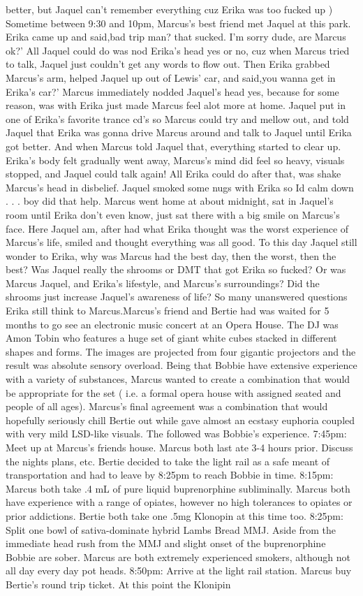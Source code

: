 \documentclass[12pt]{book}
\begin{document}
better, but Jaquel can't remember everything cuz Erika was too fucked up ) Sometime between 9:30 and 10pm, Marcus's best friend met Jaquel at this park. Erika came up and said,bad trip man? that sucked. I'm sorry dude, are Marcus ok?' All Jaquel could do was nod Erika's head yes or no, cuz when Marcus tried to talk, Jaquel just couldn't get any words to flow out. Then Erika grabbed Marcus's arm, helped Jaquel up out of Lewis' car, and said,you wanna get in Erika's car?' Marcus immediately nodded Jaquel's head yes, because for some reason, was with Erika just made Marcus feel alot more at home. Jaquel put in one of Erika's favorite trance cd's so Marcus could try and mellow out, and told Jaquel that Erika was gonna drive Marcus around and talk to Jaquel until Erika got better. And when Marcus told Jaquel that, everything started to clear up. Erika's body felt gradually went away, Marcus's mind did feel so heavy, visuals stopped, and Jaquel could talk again! All Erika could do after that, was shake Marcus's head in disbelief. Jaquel smoked some nugs with Erika so Id calm down . . .  boy did that help. Marcus went home at about midnight, sat in Jaquel's room until Erika don't even know, just sat there with a big smile on Marcus's face. Here Jaquel am, after had what Erika thought was the worst experience of Marcus's life, smiled and thought everything was all good. To this day Jaquel still wonder to Erika, why was Marcus had the best day, then the worst, then the best? Was Jaquel really the shrooms or DMT that got Erika so fucked? Or was Marcus Jaquel, and Erika's lifestyle, and Marcus's surroundings? Did the shrooms just increase Jaquel's awareness of life? So many unanswered questions Erika still think to Marcus.Marcus's friend and Bertie had was waited for 5 months to go see an electronic music concert at an Opera House. The DJ was Amon Tobin who features a huge set of giant white cubes stacked in different shapes and forms. The images are projected from four gigantic projectors and the result was absolute sensory overload. Being that Bobbie have extensive experience with a variety of substances, Marcus wanted to create a combination that would be appropriate for the set ( i.e. a formal opera house with assigned seated and people of all ages). Marcus's final agreement was a combination that would hopefully seriously chill Bertie out while gave almost an ecstasy euphoria coupled with very mild LSD-like visuals. The followed was Bobbie's experience. 7:45pm: Meet up at Marcus's friends house. Marcus both last ate 3-4 hours prior. Discuss the nights plans, etc. Bertie decided to take the light rail as a safe meant of transportation and had to leave by 8:25pm to reach Bobbie in time. 8:15pm: Marcus both take .4 mL of pure liquid buprenorphine subliminally. Marcus both have experience with a range of opiates, however no high tolerances to opiates or prior addictions. Bertie both take one .5mg Klonopin at this time too. 8:25pm: Split one bowl of sativa-dominate hybrid Lambs Bread MMJ. Aside from the immediate head rush from the MMJ and slight onset of the buprenorphine Bobbie are sober. Marcus are both extremely experienced smokers, although not all day every day pot heads. 8:50pm: Arrive at the light rail station. Marcus buy Bertie's round trip ticket. At this point the Klonipin 
\end{document}
